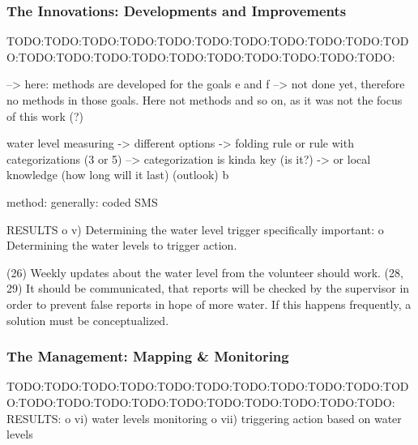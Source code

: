 \subsubsection{The Innovations: Developments and Improvements}
TODO:TODO:TODO:TODO:TODO:TODO:TODO:TODO:TODO:TODO:TODO:TODO:TODO:TODO:TODO:TODO:TODO:TODO:TODO:TODO:TODO:

--> here: methods are developed for the goals e and f --> not done yet, therefore no methods in those goals. Here not methods and so on, as it was not the focus of this work (?)


water level measuring
-> different options
-> folding rule or rule with categorizations (3 or 5) --> categorization is kinda key (is it?)
-> or local knowledge (how long will it last) (outlook) b

method: generally: coded SMS

RESULTS
o	v) Determining the water level trigger
specifically important:
o	Determining the water levels to trigger action.










(26) Weekly updates about the water level from the volunteer should work.
(28, 29) It should be communicated, that reports will be checked by the supervisor in order to prevent false reports in hope of more water. If this happens frequently, a solution must be conceptualized.













\subsubsection{The Management: Mapping \& Monitoring}
TODO:TODO:TODO:TODO:TODO:TODO:TODO:TODO:TODO:TODO:TODO:TODO:TODO:TODO:TODO:TODO:TODO:TODO:TODO:TODO:TODO:
RESULTS:
o	vi) water levels monitoring
o	vii) triggering action based on water levels


